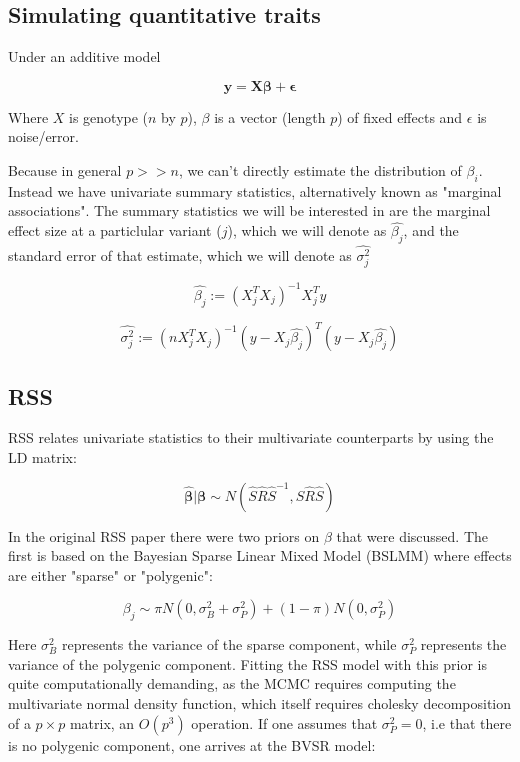 \subsection{Simulating quantitative traits}\label{sec:orgaf04e86}

Under an additive model

$$ \textbf{y}= \textbf{X} \boldsymbol{\beta} + \boldsymbol{\epsilon}$$

Where \(X\) is genotype (\(n\) by \(p\)), \(\beta\) is a vector (length \(p\)) of fixed effects and \(\epsilon\) is noise/error.

Because in general \(p >>n\), we can't directly estimate the distribution of \(\beta_i\).  Instead we have univariate summary statistics, alternatively known
as "marginal associations".  The summary statistics we will be interested in are the marginal effect size at a particlular variant (\(j\)), which we will denote as
\(\hat{\beta_j}\), and the standard error of that estimate, which we will denote as \(\hat{\sigma_j^2}\)

$$ \hat{\beta_j} := (X_j^TX_j)^{-1}X_j^Ty $$

$$ \hat{\sigma_j^2} := (nX_j^TX_j)^{-1}(y-X_j\hat{\beta_j})^T(y-X_j\hat{\beta_j}) $$

\subsection{RSS}\label{sec:orgb0b15e2}

RSS relates univariate statistics to their multivariate counterparts by using the LD matrix:

$$ \hat{\boldsymbol{\beta}} | \boldsymbol{\beta} \sim N(\hat{S}\hat{R}\hat{S}^{-1},\hat{S}\hat{R}\hat{S}) $$

In the original RSS paper there were two priors on \(\beta\) that were discussed.  The first is based on the Bayesian Sparse Linear Mixed Model (BSLMM) \cite{bslmm} where effects are either "sparse" or "polygenic":

$$ \beta_j \sim \pi N(0,\sigma^2_B+\sigma^2_P)+(1-\pi) N(0,\sigma^2_P) $$

Here \(\sigma^2_B\) represents the variance of the sparse component, while \(\sigma^2_P\) represents the variance of the polygenic component. Fitting the RSS model with this prior is quite computationally demanding, 
as the MCMC requires computing the multivariate normal density function, which itself requires cholesky decomposition of a \(p \times p\) matrix, an \(O(p^3)\) operation.  If one assumes that \(\sigma^2_P=0\),
i.e that there is no polygenic component, one arrives at the BVSR model:

